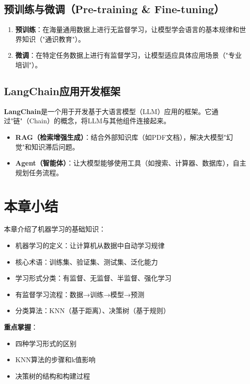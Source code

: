 \subsection{预训练与微调（Pre-training \& Fine-tuning）}
\begin{enumerate}[leftmargin=2em,itemsep=0pt]
    \item \textbf{预训练}：在海量通用数据上进行无监督学习，让模型学会语言的基本规律和世界知识（"通识教育"）。
    \item \textbf{微调}：在特定任务数据上进行有监督学习，让模型适应具体应用场景（"专业培训"）。
\end{enumerate}

\subsection{LangChain应用开发框架}
\textbf{LangChain}是一个用于开发基于大语言模型（LLM）应用的框架。它通过"链"（Chain）的概念，将LLM与其他组件连接起来。
\begin{itemize}[leftmargin=2em,itemsep=0pt]
    \item \textbf{RAG（检索增强生成）}：结合外部知识库（如PDF文档），解决大模型"幻觉"和知识滞后问题。
    \item \textbf{Agent（智能体）}：让大模型能够使用工具（如搜索、计算器、数据库），自主规划任务流程。
\end{itemize}

\section{本章小结}

本章介绍了机器学习的基础知识：
\begin{itemize}[leftmargin=2em,itemsep=0pt]
    \item 机器学习的定义：让计算机从数据中自动学习规律
    \item 核心术语：训练集、验证集、测试集、泛化能力
    \item 学习形式分类：有监督、无监督、半监督、强化学习
    \item 有监督学习流程：数据→训练→模型→预测
    \item 分类算法：KNN（基于距离）、决策树（基于规则）
\end{itemize}

\textbf{重点掌握}：
\begin{itemize}[leftmargin=2em,itemsep=0pt]
    \item 四种学习形式的区别
    \item KNN算法的步骤和k值影响
    \item 决策树的结构和构建过程
\end{itemize}
